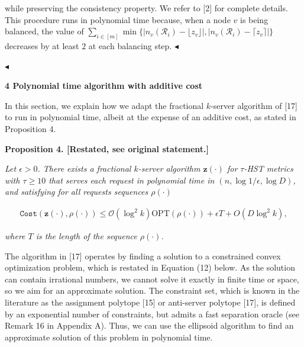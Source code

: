\documentclass[10pt,a4paper]{article}
\begin{document}
while preserving the consistency property. We refer to [2] for complete details. This procedure runs in polynomial time because, when a node $v$ is being balanced, the value of $\sum_{i\in[m]}\min\{|n_{v}(\mathcal{R}_{i})-{\lfloor z_{v}\rfloor}|,|n_{v}(\mathcal{R}_{i})-{\lceil z_{v}\rceil}|\}$ decreases by at least $2$ at each balancing step.
$\blacktriangleleft$\par




$\blacktriangleleft$\par






\par\medskip\noindent\textbf{
4 Polynomial time algorithm with additive cost}\par




In this section, we explain how we adapt the fractional $k$-server algorithm of [17] to run in polynomial time, albeit at the expense of an additive cost, as stated in Proposition 4.\par






\par\medskip\noindent\textbf{
\textbf{Proposition 4}\textbf{.}
[Restated, see original statement.]}\par



\emph{Let $\epsilon>0$. There exists a
fractional $k$-server algorithm ${\mathbf{z}}(\cdot)$ for $\tau$-HST metrics with $\tau\geq 10$ that serves each request in polynomial time in $(n,\log 1/\epsilon,\log D)$, and satisfying for all requests sequences $\rho(\cdot)$}\par


\[\begin{gathered}
{\texttt{Cost}}({\mathbf{z}}(\cdot),\rho(\cdot))\leq\mathcal{O}(\log^{2}k){\text{OPT}}(\rho(\cdot))+\epsilon T+O(D\log^{2}k),
\end{gathered}\]


\emph{where $T$ is the length of the sequence $\rho(\cdot)$.}\par







The algorithm in [17] operates by finding a solution to a constrained convex optimization problem, which is restated in Equation (12) below. As the solution can contain irrational numbers, we cannot solve it exactly in finite time or space, so we aim for an approximate solution. The constraint set, which is known in the literature as the assignment polytope [15] or anti-server polytope [17], is defined by an exponential number of constraints, but admits a fast separation oracle (see Remark 16 in Appendix A). Thus, we can use the ellipsoid algorithm to find an approximate solution of this problem in polynomial time.\par
\end{document}

